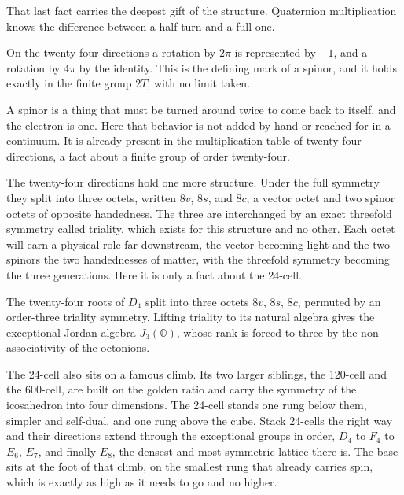 That last fact carries the deepest gift of the structure. Quaternion multiplication knows the difference between a half turn and a full one.

\begin{theorem}
On the twenty-four directions a rotation by $2\pi$ is represented by $-1$, and a rotation by $4\pi$ by the identity. This is the defining mark of a spinor, and it holds exactly in the finite group $2T$, with no limit taken.
\end{theorem}

A spinor is a thing that must be turned around twice to come back to itself, and the electron is one. Here that behavior is not added by hand or reached for in a continuum. It is already present in the multiplication table of twenty-four directions, a fact about a finite group of order twenty-four.

The twenty-four directions hold one more structure. Under the full symmetry they split into three octets, written $8v$, $8s$, and $8c$, a vector octet and two spinor octets of opposite handedness. The three are interchanged by an exact threefold symmetry called triality, which exists for this structure and no other. Each octet will earn a physical role far downstream, the vector becoming light and the two spinors the two handednesses of matter, with the threefold symmetry becoming the three generations. Here it is only a fact about the 24-cell.

\begin{proposition}[Triality]
The twenty-four roots of $D_4$ split into three octets $8v$, $8s$, $8c$, permuted by an order-three triality symmetry. Lifting triality to its natural algebra gives the exceptional Jordan algebra $J_3(\mathbb{O})$, whose rank is forced to three by the non-associativity of the octonions.
\end{proposition}

The 24-cell also sits on a famous climb. Its two larger siblings, the 120-cell and the 600-cell, are built on the golden ratio and carry the symmetry of the icosahedron into four dimensions. The 24-cell stands one rung below them, simpler and self-dual, and one rung above the cube. Stack 24-cells the right way and their directions extend through the exceptional groups in order, $D_4$ to $F_4$ to $E_6$, $E_7$, and finally $E_8$, the densest and most symmetric lattice there is. The base sits at the foot of that climb, on the smallest rung that already carries spin, which is exactly as high as it needs to go and no higher.
